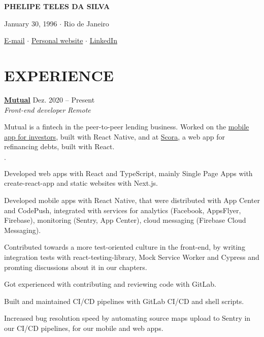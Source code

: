 \documentclass[12pt]{article}
\newenvironment{tightlist}
  {\begin{list}
    {$\cdot$}
    {
      \setlength{\leftmargin}{0em}
      \setlength{\itemsep}{\smallskipamount}
    }
  }
{\end{list}}
\begin{document}
\pagestyle{empty}

\centerline{\huge\bf PHELIPE TELES DA SILVA}
\medskip

\centerline{January 30, 1996 $\cdot$ Rio de Janeiro}
\smallskip

\centerline{
  \href{mailto:telesphelipe@gmail.com}{E-mail}
  $\cdot$
  \href{https://phelipetls.github.io}{Personal website}
  $\cdot$
  \href{https://linkedin.com/in/phelipeteles}{LinkedIn}
}
\smallskip

\section*{EXPERIENCE}

\textbf{\href{https://mutual.club}{Mutual}} \hfill Dez. 2020 -- Present \\
\textit{Front-end developer} \hfill \textit{Remote} {\parfillskip=0pt\par}

Mutual is a fintech in the peer-to-peer lending business. Worked on the
\href{https://mutual.club/en/invest.html}{mobile app for investors}, built with
React Native, and at \href{https://scora.com.br/}{Scora}, a web app for
refinancing debts, built with React.

\medskip

\begin{tightlist}
  \item Developed web apps with React and TypeScript, mainly Single Page Apps
    with create-react-app and static websites with Next.js.
  \item Developed mobile apps with React Native, that were distributed with App
    Center and CodePush, integrated with services for analytics (Facebook,
    AppsFlyer, Firebase), monitoring (Sentry, App Center), cloud messaging
    (Firebase Cloud Messaging).
  \item Contributed towards a more test-oriented culture in the front-end, by
    writing integration tests with react-testing-library, Mock Service Worker
    and Cypress and promting discussions about it in our chapters.
  \item Got experienced with contributing and reviewing code with GitLab.
  \item Built and maintained CI/CD pipelines with GitLab CI/CD and shell
    scripts.
  \item Increased bug resolution speed by automating source maps upload to
    Sentry in our CI/CD pipelines, for our mobile and web apps.
\end{tightlist}
\end{document}
